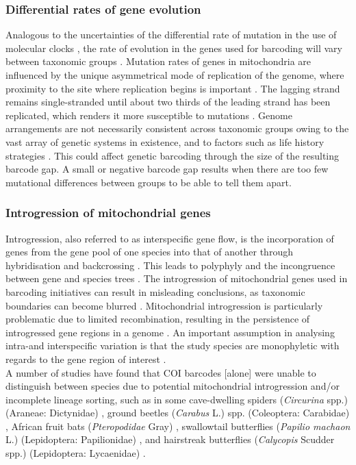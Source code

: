 \subsubsection{Differential rates of gene evolution}
Analogous to the uncertainties of the differential rate of mutation in the use of molecular clocks \citep{Penny2005, Pulquerio2007, Weir2008}, the rate of evolution in the genes used for barcoding will vary between taxonomic groups \citep{Rubinoff2006a}. Mutation rates of genes in mitochondria are influenced by the unique asymmetrical mode of replication of the genome, where proximity to the site where replication begins is important \citep{Gibson2004}. The lagging strand remains single-stranded until about two thirds of the leading strand has been replicated, which renders it more susceptible to mutations \citep{Clayton2003, Rubinoff2006}. Genome arrangements are not necessarily consistent across taxonomic groups owing to the vast array of genetic systems in existence, and to factors such as life history strategies \citep{Rubinoff2006}. 
This could affect genetic barcoding through the size of the resulting barcode gap. A small or negative barcode gap results when there are too few mutational differences between groups to be able to tell them apart.

\subsubsection{Introgression of mitochondrial genes}
Introgression, also referred to as interspecific gene flow, is the incorporation of genes from the gene pool of one species into that of another through hybridisation and backcrossing \citep{Funk2003, Harrison2014}. This leads to polyphyly and the incongruence between gene and species trees \citep{Funk2003, Petit2009}. The introgression of mitochondrial genes used in barcoding initiatives can result in misleading conclusions, as taxonomic boundaries can become blurred \citep{Rubinoff2006, Petit2009, Ermakov2015}.
Mitochondrial introgression is particularly problematic due to limited recombination, resulting in the persistence of introgressed gene regions in a genome \citep{Funk2003}. An important assumption in analysing intra-and interspecific variation is that the study species are monophyletic with regards to the gene region of interest \citep{Funk2003}. \\
A number of studies have found that COI barcodes [alone] were unable to distinguish between species due to potential mitochondrial introgression and/or incomplete lineage sorting, such as in some cave-dwelling spiders (\textit{Circurina} spp.) (Araneae: Dictynidae) \citep{Paquin}, ground beetles (\textit{Carabus} L.) spp. (Coleoptera: Carabidae) \citep{Sota2001, Raupach2010}, African fruit bats (\textit{Pteropodidae} Gray) \citep{Nesi2011}, swallowtail butterflies (\textit{Papilio machaon} L.) (Lepidoptera: Papilionidae) \citep{Sperling1994}, and hairstreak butterflies (\textit{Calycopis} Scudder spp.) (Lepidoptera: Lycaenidae) \citep{Cong2017}. 

